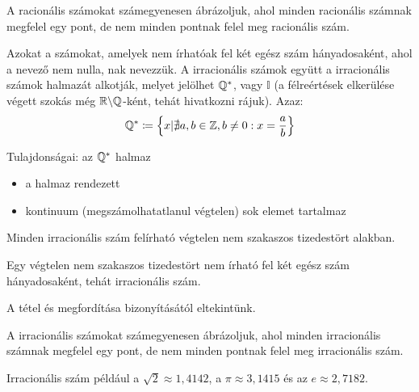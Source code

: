 \begin{note}
A racionális számokat számegyenesen ábrázoljuk, ahol minden racionális számnak
megfelel egy pont, de nem minden pontnak felel meg racionális szám.
\end{note}

\begin{defin2}
Azokat a számokat, amelyek nem írhatóak fel két egész szám hányadosaként, ahol
a nevező nem nulla, nak nevezzük. A irracionális
számok együtt a irracionális számok halmazát alkotják, melyet jelölhet 
$\mathbb{Q^*}$, vagy $\mathbb{I}$ (a félreértések elkerülése végett szokás még
$\mathbb{R}\backslash\mathbb{Q}$-ként, tehát 
hivatkozni rájuk). Azaz:
\[
  \mathbb{Q^*} \coloneqq \Big\{x | \nexists a, b \in \mathbb{Z}, b \neq 0 :
  x = \dfrac{a}{b}\Big\}
\]

Tulajdonságai: az $\mathbb{Q^*}$ halmaz
\begin{itemize}
\item a halmaz rendezett
\item kontinuum (megszámolhatatlanul végtelen) sok elemet tartalmaz
\end{itemize}
\end{defin2}

\begin{theorem2}
\label{theorem:irracfrac}
Minden irracionális szám felírható végtelen nem szakaszos tizedestört alakban.
\end{theorem2}

\begin{theoremconv2}
\label{theorem:irracfracconv}
Egy végtelen nem szakaszos tizedestört nem írható fel két egész szám
hányadosaként, tehát irracionális szám.
\end{theoremconv2}

\begin{proof5}
A tétel és megfordítása bizonyításától eltekintünk.
\end{proof5}

\begin{note2}
A irracionális számokat számegyenesen ábrázoljuk, ahol minden irracionális
számnak megfelel egy pont, de nem minden pontnak felel meg irracionális szám.

Irracionális szám például a $\sqrt{2} \approx 1,4142$, a $\pi \approx 3,1415$
és az $e \approx 2,7182$.
\end{note2}

